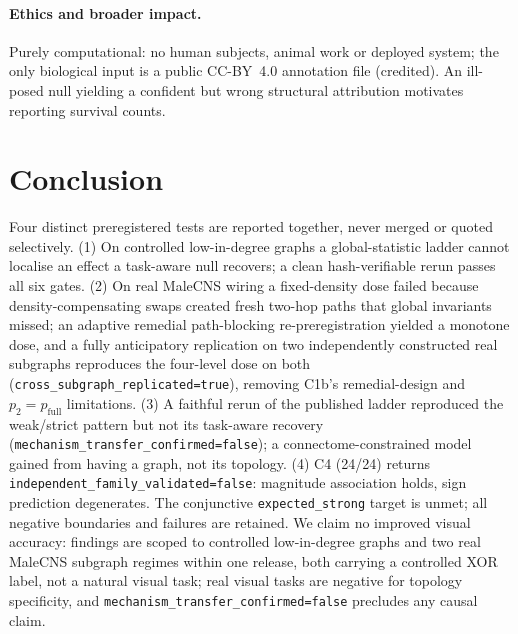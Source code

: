 \documentclass[10pt,twocolumn,letterpaper]{article}
\begin{document}
\paragraph{Ethics and broader impact.}
Purely computational: no human subjects, animal work or deployed system; the
only biological input is a public CC-BY~4.0 annotation file (credited). An
ill-posed null yielding a confident but wrong structural attribution motivates
reporting survival counts.

\section{Conclusion}
\label{sec:conclusion}

Four distinct preregistered tests are reported together, never merged or
quoted selectively. (1) On controlled low-in-degree graphs a global-statistic
ladder cannot localise an effect a task-aware null recovers; a clean
hash-verifiable rerun passes all six gates. (2) On real MaleCNS wiring a
fixed-density dose failed because density-compensating swaps created fresh
two-hop paths that global invariants missed; an adaptive remedial
path-blocking re-preregistration yielded a monotone dose, and a fully
anticipatory replication on two independently constructed real subgraphs
reproduces the four-level dose on both
(\texttt{cross\_subgraph\_replicated=true}), removing C1b's remedial-design
and $p_2{=}p_{\mathrm{full}}$ limitations. (3) A faithful rerun of the
published ladder reproduced the weak/strict pattern but not its task-aware
recovery (\texttt{mechanism\_transfer\_confirmed=false}); a
connectome-constrained model gained from having a graph, not its topology.
(4) C4 (24/24) returns \texttt{independent\_family\_validated=false}:
magnitude association holds, sign prediction degenerates. The conjunctive
\texttt{expected\_strong} target is unmet; all negative boundaries and
failures are retained. We claim no improved visual accuracy: findings are
scoped to controlled low-in-degree graphs and two real MaleCNS subgraph
regimes within one release, both carrying a controlled XOR label, not a
natural visual task; real visual tasks are negative for topology specificity,
and \texttt{mechanism\_transfer\_confirmed=false} precludes any causal claim.

\clearpage
\end{document}

